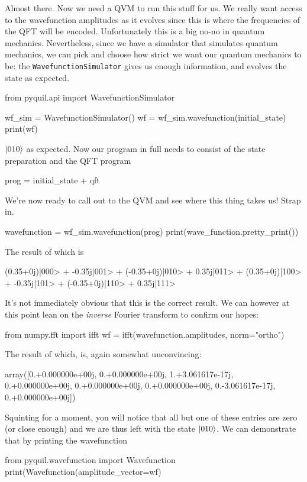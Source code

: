 Almost there. Now we need a QVM to run this stuff for us. We really want access to the wavefunction amplitudes as it evolves since this is where the frequencies of the QFT will be encoded. Unfortunately this is a big no-no in quantum mechanics. Nevertheless, since we have a simulator that simulates quantum mechanics, we can pick and choose how strict we want our quantum mechanics to be: the \verb|WavefunctionSimulator| gives us enough information, and evolves the state as expected.

\begin{python}
from pyquil.api import WavefunctionSimulator

wf_sim = WavefunctionSimulator()
wf = wf_sim.wavefunction(initial_state)
print(wf)
\end{python}

$\ket{010}$ as expected. Now our program in full needs to consist of the state preparation and the QFT program

\begin{python}
prog = initial_state + qft
\end{python}

We're now ready to call out to the QVM and see where this thing takes us! Strap in.

\begin{python}
wavefunction = wf_sim.wavefunction(prog)
print(wave_function.pretty_print())
\end{python}

The result of which is 
\begin{python}
(0.35+0j)|000> + -0.35j|001> 
+ (-0.35+0j)|010> + 0.35j|011> 
+ (0.35+0j)|100> + -0.35j|101> 
+ (-0.35+0j)|110> + 0.35j|111>
\end{python}
It's not immediately obvious that this is the correct result. We can however at this point lean on the \emph{inverse} Fourier transform to confirm our hopes:

\begin{python}
from numpy.fft import ifft
wf = ifft(wavefunction.amplitudes, norm="ortho")
\end{python}

The result of which, is, again somewhat unconvincing:

\begin{python}
array([0.+0.000000e+00j, 0.+0.000000e+00j, 1.+3.061617e-17j,
       0.+0.000000e+00j, 0.+0.000000e+00j, 0.+0.000000e+00j,
       0.-3.061617e-17j, 0.+0.000000e+00j])
\end{python}

Squinting for a moment, you will notice that all but one of these entries are zero (or close enough) and we are thus left with the state $\ket{010}$. We can demonstrate that by printing the wavefunction

\begin{python}
from pyquil.wavefunction import Wavefunction
print(Wavefunction(amplitude_vector=wf)
\end{python}